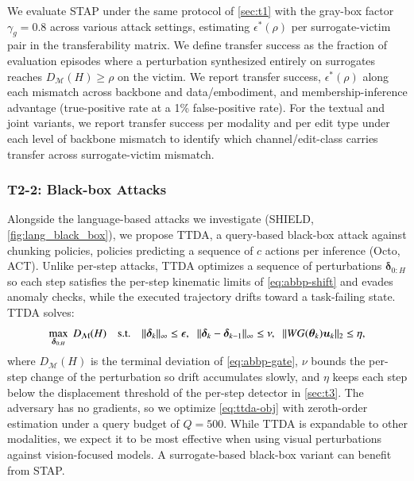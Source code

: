 \documentclass[11pt,letterpaper]{article}
\begin{document}
 We evaluate STAP under the same protocol of \autoref{sec:t1} with the gray-box factor $\gamma_{g}=0.8$ across various attack settings, estimating $\epsilon^{*}(\rho)$ per surrogate-victim pair in the transferability matrix. 
We define transfer success as the fraction of evaluation episodes where a perturbation synthesized entirely on surrogates reaches $D_{\mathcal{M}}(H)\ge\rho$ on the victim. We report transfer success, $\epsilon^{*}(\rho)$ along each mismatch across backbone and data/embodiment, and membership-inference advantage (true-positive rate at a 1\% false-positive rate). For the textual and joint variants, we report transfer success per modality and per edit type under each level of backbone mismatch to identify which channel/edit-class carries transfer across surrogate-victim mismatch.

\subsubsection{T2-2: Black-box Attacks} \label{sec:t2_2}

 Alongside the language-based attacks we investigate (\eg SHIELD, \autoref{fig:lang_black_box}), we propose TTDA, a query-based black-box attack against chunking policies, \ie policies predicting a sequence of $c$ actions per inference (\eg Octo, ACT). 
Unlike per-step attacks, TTDA optimizes a sequence of perturbations $\bm{\delta}_{0:H}$ so each step satisfies the per-step kinematic limits of \autoref{eq:abbp-shift} and evades anomaly checks, while the executed trajectory drifts toward a task-failing state. TTDA solves:
\vspace{-1.5ex}\begin{equation}
\max_{\bm{\delta}_{0:H}}\; D_{\mathcal{M}}(H)
\quad\text{s.t.}\quad
\|\bm{\delta}_k\|_{\infty}\le\epsilon,\;\;
\|\bm{\delta}_k-\bm{\delta}_{k-1}\|_{\infty}\le\nu,\;\;
\|W G(\bm{\theta}_k)\bm{u}_k\|_{2}\le\eta,
\label{eq:ttda-obj}
\vspace{-1.5ex}\end{equation}
where $D_{\mathcal{M}}(H)$ is the terminal deviation of \autoref{eq:abbp-gate}, $\nu$ bounds the per-step change of the perturbation so drift accumulates slowly, and $\eta$ keeps each step below the displacement threshold of the per-step detector in \autoref{sec:t3}. The adversary has no gradients, so we optimize \autoref{eq:ttda-obj} with zeroth-order estimation under a query budget
of $Q{=}500$. 
While TTDA is expandable to other modalities, we expect it to be most effective when using visual perturbations against vision-focused models.
A surrogate-based black-box variant can benefit from STAP. 
\end{document}
